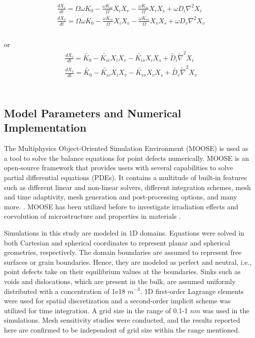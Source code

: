 \documentclass[utf8]{frontiersSCNS} %
\begin{document}
    \begin{equation}
      \begin{aligned}
        &\frac{dX_i}{dt} = \Omega\omega K_0 - \frac{\omega K_{iv}}{\Omega}X_iX_v - \frac{\omega K_{is}}{\Omega}X_iX_s + \omega D_i\nabla^2 X_i\\
        &\frac{dX_v}{dt} = \Omega\omega K_0 - \frac{\omega K_{iv}}{\Omega}X_iX_v - \frac{\omega K_{vs}}{\Omega}X_vX_s + \omega D_v\nabla^2 X_v\\
      \end{aligned}
      \label{equation:non-dimensionalized_point_defect_equations}
    \end{equation}\\
    or
    \begin{equation}
      \begin{aligned}
        &\frac{dX_i}{dt} = \widetilde{K_0} - \widetilde{K_{iv}}X_iX_v - \widetilde{K_{is}}X_iX_s + \widetilde{D_i}\widetilde{\nabla}^2 X_i\\
        &\frac{dX_v}{dt} = \widetilde{K_0} - \widetilde{K_{iv}}X_iX_v - \widetilde{K_{vs}}X_vX_s + \widetilde{D_v}\widetilde{\nabla}^2 X_v\\
      \end{aligned}
      \label{equation:non-dimensionalized_point_defect_equations}
    \end{equation}\\

\subsection{Model Parameters and Numerical Implementation}
    The Multiphysics Object-Oriented Simulation Environment (MOOSE) is used as a tool to solve the balance equations for point defects numerically. MOOSE is an open-source framework that provides users with several capabilities to solve partial differential equations (PDEs). It contains a multitude of built-in features such as different linear and non-linear solvers, different integration schemes, mesh and time adaptivity, mesh generation and post-processing options, and many more. \citep{permann2020}. MOOSE has been utilized before to investigate irradiation effects and coevolution of microstructure and properties in materials \citep{ahmed2020,tonks2018,ahmed2018,abdoelatef2019,badry2019}.
    
    Simulations in this study are modeled in 1D domains. Equations were solved in both Cartesian and spherical coordinates to represent planar and spherical geometries, respectively. The domain boundaries are assumed to represent free surfaces or grain boundaries. Hence, they are modeled as perfect and neutral, i.e., point defects take on their equilibrium values at the boundaries. Sinks such as voids and dislocations, which are present in the bulk, are assumed uniformly distributed with a concentration of 1e18 $m^{-3}$. 1D first-order Lagrange elements were used for spatial discretization and a second-order implicit scheme was utilized for time integration. A grid size in the range of 0.1-1 $nm$ was used in the simulations. Mesh sensitivity studies were conducted, and the results reported here are confirmed to be independent of grid size within the range mentioned.
    
\end{document}
